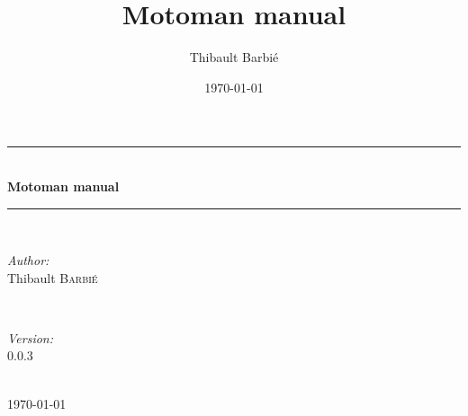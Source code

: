 \documentclass{book}
\title{Motoman manual}
\author{Thibault Barbié}
\date{\today}
\begin{document}
\begin{titlepage}
\newcommand{\HRule}{\rule{\linewidth}{0.5mm}}
\center

\HRule \\[1.5cm]
{ \huge \bfseries Motoman manual}\\[0.4cm] 
\HRule \\[1.5cm]

\begin{minipage}{0.4\textwidth}
\begin{flushleft} \large
\emph{Author:}\\
Thibault \textsc{Barbi\'{e}} %
\end{flushleft}
\end{minipage}
~
\begin{minipage}{0.4\textwidth}
\begin{flushright} \large
\emph{Version:}\\
0.0.3 
\end{flushright}
\end{minipage}\\[4cm]

{\large \today}\\[3cm] 
\vfill 

\end{titlepage}

\tableofcontents
\newpage






\end{document}
